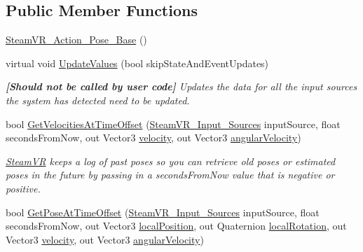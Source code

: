 \subsection*{Public Member Functions}
\begin{DoxyCompactItemize}
\item 
\mbox{\hyperlink{class_valve_1_1_v_r_1_1_steam_v_r___action___pose___base_a6d6534444612fba63fc9723f86745168}{Steam\+V\+R\+\_\+\+Action\+\_\+\+Pose\+\_\+\+Base}} ()
\item 
virtual void \mbox{\hyperlink{class_valve_1_1_v_r_1_1_steam_v_r___action___pose___base_ad1269e7f3b8399dfe46e7fd85f8ed481}{Update\+Values}} (bool skip\+State\+And\+Event\+Updates)
\begin{DoxyCompactList}\small\item\em {\bfseries{\mbox{[}Should not be called by user code\mbox{]}}} Updates the data for all the input sources the system has detected need to be updated. \end{DoxyCompactList}\item 
bool \mbox{\hyperlink{class_valve_1_1_v_r_1_1_steam_v_r___action___pose___base_a078b2d70fcd9796f0872f03c6eb4cd37}{Get\+Velocities\+At\+Time\+Offset}} (\mbox{\hyperlink{namespace_valve_1_1_v_r_a82e5bf501cc3aa155444ee3f0662853f}{Steam\+V\+R\+\_\+\+Input\+\_\+\+Sources}} input\+Source, float seconds\+From\+Now, out Vector3 \mbox{\hyperlink{class_valve_1_1_v_r_1_1_steam_v_r___action___pose___base_aaf2089c742c29110276191454cda9c7a}{velocity}}, out Vector3 \mbox{\hyperlink{class_valve_1_1_v_r_1_1_steam_v_r___action___pose___base_a84bf81feaa02463f8151e1ea25e16825}{angular\+Velocity}})
\begin{DoxyCompactList}\small\item\em \mbox{\hyperlink{class_valve_1_1_v_r_1_1_steam_v_r}{Steam\+VR}} keeps a log of past poses so you can retrieve old poses or estimated poses in the future by passing in a seconds\+From\+Now value that is negative or positive. \end{DoxyCompactList}\item 
bool \mbox{\hyperlink{class_valve_1_1_v_r_1_1_steam_v_r___action___pose___base_a0edda26e08e24b20fe9f1bb2941ba4a6}{Get\+Pose\+At\+Time\+Offset}} (\mbox{\hyperlink{namespace_valve_1_1_v_r_a82e5bf501cc3aa155444ee3f0662853f}{Steam\+V\+R\+\_\+\+Input\+\_\+\+Sources}} input\+Source, float seconds\+From\+Now, out Vector3 \mbox{\hyperlink{class_valve_1_1_v_r_1_1_steam_v_r___action___pose___base_a532487bde5fc10e4f520822eacaf9b6f}{local\+Position}}, out Quaternion \mbox{\hyperlink{class_valve_1_1_v_r_1_1_steam_v_r___action___pose___base_a6390b371b472fd2f7f4f501db7dacc96}{local\+Rotation}}, out Vector3 \mbox{\hyperlink{class_valve_1_1_v_r_1_1_steam_v_r___action___pose___base_aaf2089c742c29110276191454cda9c7a}{velocity}}, out Vector3 \mbox{\hyperlink{class_valve_1_1_v_r_1_1_steam_v_r___action___pose___base_a84bf81feaa02463f8151e1ea25e16825}{angular\+Velocity}})

\end{DoxyCompactItemize}
